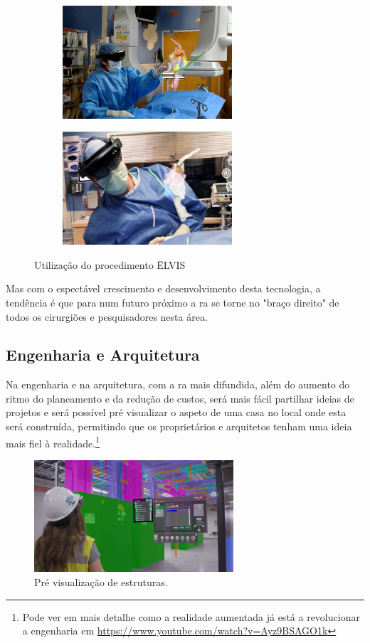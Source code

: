 \documentclass{report}
\begin{document}
\begin{figure}[H]
    \centering
    \begin{subfigure}{.5\textwidth}
      \centering
      \includegraphics[width=17em]{medicin0.jpg}
      \label{Fig:medicin0}
    \end{subfigure}%
    \begin{subfigure}{.5\textwidth}
      \centering
      \includegraphics[width=17em]{medicin1.png}
      \label{Fig:medicin1}
    \end{subfigure}
    \caption{Utilização do procedimento ĒLVIS}
    \label{Fig:medicin}
\end{figure}

Mas com o espectável crescimento e desenvolvimento desta tecnologia, a tendência é que para num futuro próximo a \ac{ra} se torne no "braço direito" de todos os cirurgiões e pesquisadores nesta área.

\subsection{Engenharia e Arquitetura}
Na engenharia e na arquitetura, com a \ac{ra} mais difundida, além do aumento do ritmo do planeamento e da redução de custos, será mais fácil partilhar ideias de projetos e será possível pré visualizar o aspeto de uma casa no local onde esta será construída, permitindo que os proprietários e arquitetos tenham uma ideia mais fiel à realidade.\footnote{Pode ver em mais detalhe como a realidade aumentada já está a revolucionar a engenharia em \url{https://www.youtube.com/watch?v=Ayz9BSAGO1k}}

\begin{figure}[H]
    \centering
    \includegraphics[width=20em]{arquieng.jpg}
    \caption{Pré visualização de estruturas.}
    \label{Fig:arquieng}
\end{figure}
\end{document}
